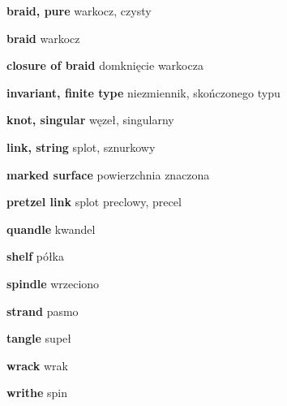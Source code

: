 \item \textbf{braid, pure} warkocz, czysty
\item \textbf{braid} warkocz
\item \textbf{closure of braid} domknięcie warkocza
\item \textbf{invariant, finite type} niezmiennik, skończonego typu
\item \textbf{knot, singular} węzeł, singularny
\item \textbf{link, string} splot, sznurkowy
\item \textbf{marked surface} powierzchnia znaczona
\item \textbf{pretzel link} splot preclowy, precel
\item \textbf{quandle} kwandel
\item \textbf{shelf} półka
\item \textbf{spindle} wrzeciono
\item \textbf{strand} pasmo
\item \textbf{tangle} supeł
\item \textbf{wrack} wrak
\item \textbf{writhe} spin
